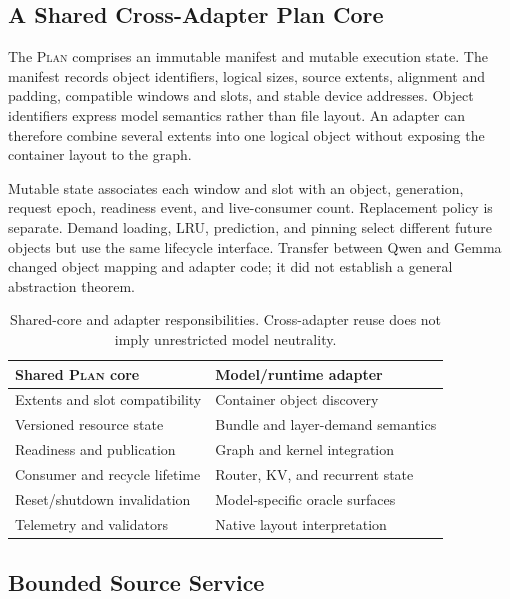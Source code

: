 \documentclass[letterpaper,twocolumn,10pt]{article}
\newcommand{\Plan}{\textsc{Plan}\xspace}
\begin{document}
\subsection{A Shared Cross-Adapter Plan Core}

The \Plan comprises an immutable manifest and mutable execution state.  The
manifest records object identifiers, logical sizes, source extents, alignment
and padding, compatible windows and slots, and stable device addresses.  Object
identifiers express model semantics rather than file layout.  An adapter can
therefore combine several extents into one logical object without exposing the
container layout to the graph.

Mutable state associates each window and slot with an object, generation,
request epoch, readiness event, and live-consumer count.  Replacement policy is
separate.  Demand loading, LRU, prediction, and pinning select different future
objects but use the same lifecycle interface.  Transfer between Qwen and Gemma
changed object mapping and adapter code; it did not establish a general
abstraction theorem.

\begin{table}[t]
  \centering
  \scriptsize
  \caption{Shared-core and adapter responsibilities.  Cross-adapter reuse does
  not imply unrestricted model neutrality.}
  \label{tab:interface}
  \begin{tabularx}{\columnwidth}{@{}p{}X@{}}
    \toprule
    Shared \Plan core & Model/runtime adapter \\
    \midrule
    Extents and slot compatibility & Container object discovery \\
    Versioned resource state & Bundle and layer-demand semantics \\
    Readiness and publication & Graph and kernel integration \\
    Consumer and recycle lifetime & Router, KV, and recurrent state \\
    Reset/shutdown invalidation & Model-specific oracle surfaces \\
    Telemetry and validators & Native layout interpretation \\
    \bottomrule
  \end{tabularx}
\end{table}

\subsection{Bounded Source Service}
\end{document}
